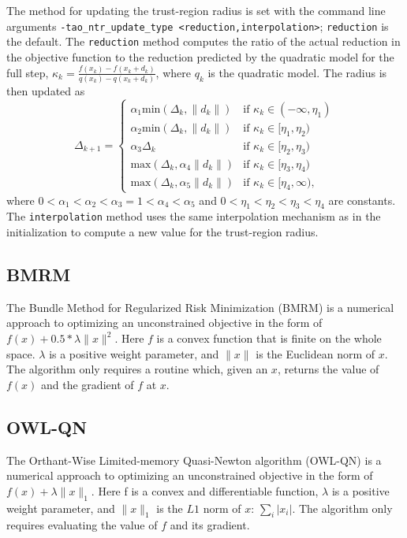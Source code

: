 The method for updating the trust-region radius is set with the 
command line arguments 
{\tt -tao\_ntr\_update\_type <reduction,interpolation>}; {\tt reduction} 
is the default.  The {\tt reduction} method computes the ratio of the 
actual reduction in the objective function to the reduction predicted 
by the quadratic model for the full step, 
$\kappa_k = \frac{f(x_k) - f(x_k + d_k)}{q(x_k) - q(x_k + d_k)}$, where 
$q_k$ is the quadratic model.  The radius is then updated as
\[
\Delta_{k+1} = \left\{\begin{array}{ll}
\alpha_1 \mbox{min}(\Delta_k, \|d_k\|) & \mbox{if } \kappa_k \in (-\infty, \eta_1) \\
\alpha_2 \mbox{min}(\Delta_k, \|d_k\|) & \mbox{if } \kappa_k \in [\eta_1, \eta_2) \\
\alpha_3 \Delta_k & \mbox{if } \kappa_k \in [\eta_2, \eta_3) \\
\mbox{max}(\Delta_k, \alpha_4 \|d_k\|) & \mbox{if } \kappa_k \in [\eta_3, \eta_4) \\
\mbox{max}(\Delta_k, \alpha_5 \|d_k\|) & \mbox{if } \kappa_k \in [\eta_4, \infty),
\end{array}
\right.
\]
where $0 < \alpha_1 < \alpha_2 < \alpha_3 = 1 < \alpha_4 < \alpha_5$ and
$0 < \eta_1 < \eta_2 < \eta_3 < \eta_4$ are constants.  The {\tt interpolation}
method uses the same interpolation mechanism as in the initialization to
compute a new value for the trust-region radius.

\subsection{BMRM}
The Bundle Method for Regularized Risk Minimization (BMRM)\cite{brmrm} is a 
numerical approach to optimizing an unconstrained objective in the form of 
$f(x) + 0.5 * \lambda \| x \|^2$.  Here $f$ is a convex function that is finite on 
the whole space.  $\lambda$ is a positive 
weight parameter, and $\| x \|$ is the Euclidean norm of $x$.  The algorithm only 
requires a routine which, given an $x$, returns the value of $f(x)$ and the 
gradient of $f$ at $x$.

\subsection{OWL-QN}
The Orthant-Wise Limited-memory Quasi-Newton algorithm (OWL-QN)\cite{owlqn}
is a numerical approach to optimizing an unconstrained objective in the 
form of $f(x) + \lambda \|x\|_1$.  Here f is a convex and differentiable 
function, $\lambda$ is a positive weight parameter, and $\| x \|_1$ is the 
$L1$ norm of $x$: $\sum_i |x_i|$.  The algorithm only requires evaluating the 
value of $f$ and its gradient.

